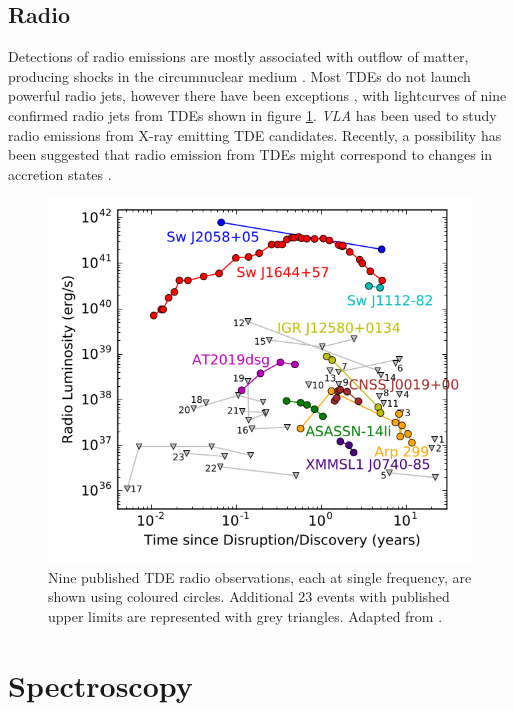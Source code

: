 \documentclass{tda}
\begin{document}
\subsection{Radio} \label{multiwave:radio}

Detections of radio emissions are mostly associated with outflow of matter, producing shocks in the circumnuclear medium \cite{bonnerot_first_2021}. Most TDEs do not launch powerful radio jets, however there have been exceptions \cite{komossa_tidal_2015}, with lightcurves of nine confirmed radio jets from TDEs shown in figure \ref{fig:radio_luminosity}. \textit{VLA} has been used to study radio emissions from X-ray emitting TDE candidates. Recently, a possibility has been suggested that radio emission from TDEs might correspond to changes in accretion states \cite{horesh_delayed_2021}.

\begin{figure} [h]
	\centering
	\captionsetup{width=.85\linewidth}
	\includegraphics[width=.35\linewidth]{./images/alexander2020.png}
	\caption{Nine published TDE radio observations, each at single frequency, are shown using coloured circles. Additional 23 events \cite{alexander_radio_2020} with published upper limits are represented with grey triangles. Adapted from \cite{alexander_radio_2020}.}
	\label{fig:radio_luminosity}
\end{figure}

\newpage
\section{Spectroscopy} \label{spectroscopy}
\end{document}
